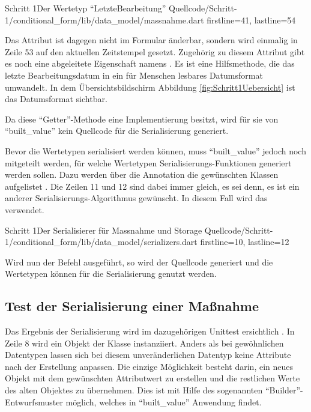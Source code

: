 \begin{alexlisting}{Schritt 1}{Der Wertetyp \enquote{LetzteBearbeitung}}
  {Quellcode/Schritt-1/conditional_form/lib/data_model/massnahme.dart}
  {firstline=41, lastline=54}
  \label{lst:Schritt1WerteTypLetzteBearbeitung}
\end{alexlisting}

Das Attribut  ist dagegen nicht im Formular änderbar, sondern wird einmalig in Zeile 53 auf den aktuellen Zeitstempel gesetzt.
Zugehörig zu diesem Attribut gibt es noch eine abgeleitete Eigenschaft namens  .
Es ist eine Hilfsmethode, die das letzte Bearbeitungsdatum in ein für Menschen lesbares Datumsformat umwandelt. In dem Übersichtsbildschirm Abbildung \ref{fig:Schritt1Uebersicht} ist das Datumsformat sichtbar.

Da diese \enquote{Getter}-Methode eine Implementierung besitzt, wird für sie von \enquote{built_value} kein Quellcode für die Serialisierung generiert.

Bevor die Wertetypen serialisiert werden können, muss \enquote{built_value} jedoch noch mitgeteilt werden, für welche Wertetypen Serialisierungs-Funktionen generiert werden sollen.
Dazu werden über die Annotation  die gewünschten Klassen aufgelistet .
Die Zeilen 11 und 12 sind dabei immer gleich, es sei denn, es ist ein anderer Serialisierungs-Algorithmus gewünscht.
In diesem Fall wird das verwendet.

\begin{alexlisting}{Schritt 1}{Der Serialisierer für Massnahme und Storage}
  {Quellcode/Schritt-1/conditional_form/lib/data_model/serializers.dart}
  {firstline=10, lastline=12}
  \label{lst:Schritt1Serialisierer}
\end{alexlisting}

Wird nun der Befehl   ausgeführt, so wird der Quellcode generiert und die Wertetypen können für die Serialisierung genutzt werden.

\subsection{Test der Serialisierung einer Maßnahme}

Das Ergebnis der Serialisierung wird im dazugehörigen Unittest ersichtlich \Lst{\ref{lst:SerialisierungEinerMassnahmeUnittest}}.
In Zeile 8 wird ein Objekt der Klasse  instanziiert.
Anders als bei gewöhnlichen Datentypen lassen sich bei diesem unveränderlichen Datentyp keine Attribute nach der Erstellung anpassen.
Die einzige Möglichkeit besteht darin, ein neues Objekt  mit dem gewünschten Attributwert zu erstellen und die restlichen Werte des alten Objektes zu übernehmen.
Dies ist mit Hilfe des sogenannten \enquote{Builder}-Entwurfsmuster möglich, welches in \enquote{built_value} Anwendung findet.

